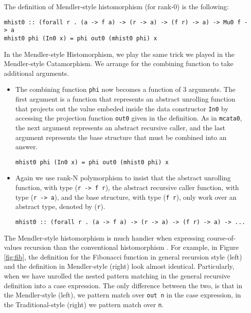 \documentclass[letterpaper,12pt]{article}
\begin{document}
The definition of Mendler-style histomorphism (for rank-0) is the following:
\begin{verbatim}
mhist0 :: (forall r . (a -> f a) -> (r -> a) -> (f r) -> a) -> Mu0 f -> a
mhist0 phi (In0 x) = phi out0 (mhist0 phi) x 
\end{verbatim}
In the Mendler-style Histomorphism, we play the same trick
we played in the Mendler-style Catamorphism. We arrange for the
combining function to take additional arguments.
\begin{itemize}
  \item The combining function \verb|phi| now becomes a function of 3 arguments. 
        The first argument is a function that represents an
        abstract unrolling function that projects out the value
        embeded inside the data constructor \verb|In0| by accessing
        the projection function \verb|out0| given in the definition.
        As in \verb|mcata0|,
        the next argument represents an abstract recursive caller, and
        the last argument represents the base structure
        that must be combined into an answer.

  \verb|mhist0 phi (In0 x) = phi out0 (mhist0 phi) x|

  \item Again we use rank-N polymorphism to insist that 
        the abstract unrolling function, with type (\verb|r -> f r|),
        the abstract recursive caller function, with type (\verb|r -> a|), and
        the base structure, with type (\verb|f r|), only work
        over an abstract type, denoted by (\verb|r|).

  \verb|mhist0 :: (forall r . (a -> f a) -> (r -> a) -> (f r) -> a) -> ...|
\end{itemize}  

The Mendler-style histomorphism is much handier when expressing
course-of-values recursion than the conventional histomorphism \cite{UusVen00}.
For example, in Figure \ref{fig:fib}, the definition for the Fibonacci function
in general recursion style (left) and the definition in Mendler-style (right)
look almost identical.  Particularly, when we have unrolled the nested pattern
matching in the general recursive definition into a case expression.
The only difference between the two, is that in the Mendler-style (left),
we pattern match over \verb|out n| in the case expression, in
the Traditional-style (right) we
pattern match over \verb|n|.  
\end{document}
